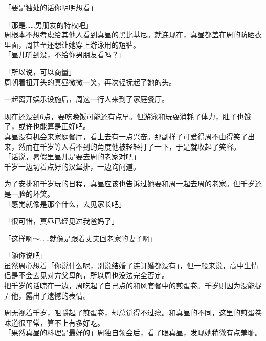 「要是独处的话你明明想看」

「那是……男朋友的特权吧」\\

周根本不想考虑给其他人看到真昼的黑比基尼。就连现在，真昼都盖在周的防晒衣里面，周甚至还想让她穿上游泳用的短裤。\\

「昼儿听到没，不给你男朋友看吗？」

「所以说，可以商量」\\

周朝着扭开头的真昼微微一笑，再次轻抚起了她的头。\\

\vspace{2\baselineskip}

一起离开娱乐设施后，周这一行人来到了家庭餐厅。

现在还没到6点，要吃晚饭可能还有点早。但游泳和玩耍消耗了体力，肚子也饿了，或许也能算是正好吧。\\

真昼没有机会来家庭餐厅，看上去有一点兴奋。那副样子可爱得周不由得笑了出来，然而在千岁等人看不到的角度他被轻轻打了一下，于是就收起了笑容。\\

「话说，暑假里昼儿是要去周的老家对吧」\\

千岁一边切着点好的汉堡排，一边询问道。

为了安排和千岁玩的日程，真昼应该也告诉过她要和周一起去周的老家。但千岁还是一脸的坏笑。\\

「感觉就像是那个什么，去见家长吧」

「很可惜，真昼已经见过我爸妈了」

「这样啊～……就像是跟着丈夫回老家的妻子啊」

「随你说吧」\\

虽然周心想着「你说什么呢，别说结婚了连订婚都没有」，但一般来说，高中生情侣是不会去见对方父母的，所以周也没法完全否定。\\

把千岁的话晾在一边，周吃起了自己点的和风套餐中的煎蛋卷。千岁则因为没能捉弄他，露出了遗憾的表情。

周无视着千岁，咀嚼起了煎蛋卷，却总觉得不过瘾。和真昼的不同，这里的煎蛋卷味道很平常，算不上有多好吃。\\

「果然真昼的料理是最好的」周独自领会后，看了眼真昼，发现她稍微有点羞耻。

